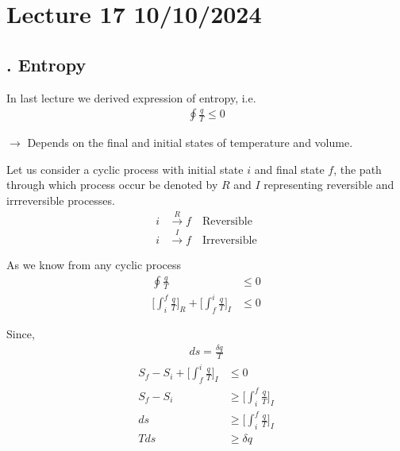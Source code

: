 \documentclass[fleqn,10pt]{SelfArx} %
\begin{document}
\clearpage

\section{Lecture 17 10/10/2024}

\subsection{. Entropy}
In last lecture we derived expression of entropy, i.e.
\begin{align*}
\oint \frac{q}{T} \leq 0 
\end{align*}

$\rightarrow$ Depends on the final and initial states of temperature and volume.

Let us consider a cyclic process with initial state $i$ and final state $f$, the path through which process occur be denoted by $R$ and $I$ representing reversible and irrreversible processes.
\begin{align*}
    i &\overset{R}{\longrightarrow} f \quad \text{Reversible} \\
    i &\overset{I}{\longrightarrow} f \quad \text{Irreversible}
\end{align*}

\begin{center}
\end{center}

As we know from any cyclic process
\begin{align}
    \oint \frac{q}{T} &\leq 0 \\
    \Big[\int^f_i \frac{q}{T}\Big]_R + \Big[\int^i_f \frac{q}{T}\Big]_I &\leq 0
\end{align}

Since, 
\begin{align}
    ds = \frac{\delta q}{T}
\end{align}
\begin{align}
    S_f - S_i + \Big[\int^i_f \frac{q}{T}\Big]_I &\leq 0 \\
    S_f - S_i &\geq \Big[\int^f_i \frac{q}{T}\Big]_I \\
    ds &\geq \Big[\int^f_i \frac{q}{T}\Big]_I \\
    Tds &\geq \delta q
\end{align}
\end{document}
